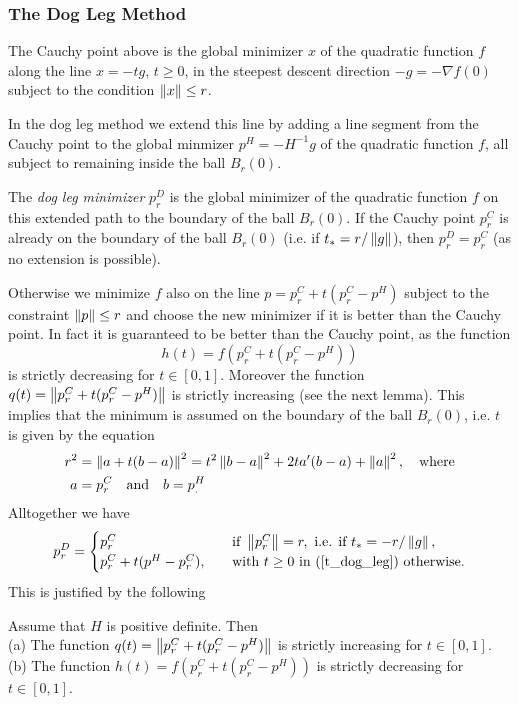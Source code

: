 \subsubsection{The Dog Leg Method}

The Cauchy point above is the global minimizer $x$ of the quadratic function $f$ along 
the line $x=-tg$, $t\geq 0$, in the steepest descent direction $-g=-\nabla f(0)$ subject 
to the condition $\left\|x\right\|\leq r$.

In the dog leg method we extend this line by adding a line segment from the Cauchy point 
to the global minmizer $p^H=-H^{-1}g$ of the quadratic function $f$, all subject to remaining
inside the ball $B_r(0)$.

The \textit{dog leg minimizer} $p^D_r$ is the global minimizer of the quadratic function $f$ 
on this extended path to the boundary of the ball $B_r(0)$. If the Cauchy point $p^C_r$ is
already on the boundary of the ball $B_r(0)$ (i.e. if $t_*=r/\left\|g\right\|$), then $p^D_r=p^C_r$
(as no extension is possible).

Otherwise we minimize $f$ also on the line $p=p^C_r+t(p^C_r-p^H)$ subject to the constraint
$\left\|p\right\|\leq r$ and choose the new minimizer if it is better than the Cauchy point. In fact
it is guaranteed to be better than the Cauchy point, as the function
$$
h(t)=f(p^C_r+t(p^C_r-p^H))
$$ 
is strictly decreasing for $t\in[0,1]$. Moreover the function
$q(t)=\left\|p^C_r+t(p^C_r-p^H)\right\|$ is strictly increasing (see the next lemma).
This implies that the minimum is assumed on the boundary of the ball $B_r(0)$, i.e. $t$ is given
by the equation
%
\begin{align}
\label{t_dog_leg}
r^2 &= \left\|a+t(b-a)\right\|^2=t^2\left\|b-a\right\|^2+2ta'(b-a)+\left\|a\right\|^2,\quad\text{where}\\\notag
a &= p^C_r\quad\text{and}\quad b = p^H_.
\end{align}
%
Alltogether we have
%
\begin{equation}
\label{DoglegPoint}
p^D_r= 
\begin{cases}
p^C_r&\text{if }\left\|p^C_r\right\|=r,\text{ i.e. if }t_*=-r/\left\|g\right\|,\\
p^C_r+t(p^H-p^C_r),\quad&\text{with }t\geq0\text{ in }(\ref{t_dog_leg})\text{ otherwise}.
\end{cases}
\end{equation}
This is justified by the following
%
\begin{lem}
\label{lem:dogleg}
Assume that $H$ is positive definite. Then\\
(a) The function $q(t)=\left\|p^C_r+t(p^C_r-p^H)\right\|$ is strictly increasing for $t\in[0,1]$.\\
(b) The function $h(t)=f(p^C_r+t(p^C_r-p^H))$ is strictly decreasing for $t\in[0,1]$.
\end{lem}
% 

